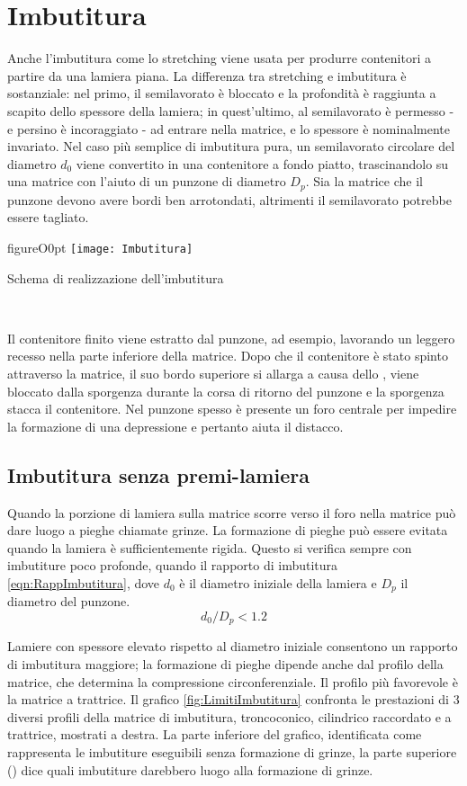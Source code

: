 \section{Imbutitura}
Anche l'imbutitura come lo stretching viene usata per produrre contenitori a partire da una lamiera piana. La differenza tra stretching e imbutitura è sostanziale: nel primo, il semilavorato è bloccato e la profondità è raggiunta a scapito dello spessore della lamiera; in quest'ultimo, al semilavorato è permesso - e persino è incoraggiato - ad entrare nella matrice, e lo spessore è nominalmente invariato.
Nel caso più semplice di imbutitura pura, un semilavorato circolare del diametro $d_0$ viene convertito in una contenitore a fondo piatto, trascinandolo su una matrice con l'aiuto di un punzone di diametro $D_p$.
Sia la matrice che il punzone devono avere bordi ben arrotondati, altrimenti il semilavorato potrebbe essere tagliato.

\begin{wrapfloat}{figure}{O}{0pt}
\texttt{[image: Imbutitura]}
\caption{Schema di realizzazione dell'imbutitura}
\label{fig:Imbutitura}
\end{wrapfloat}\

Il contenitore finito viene estratto dal punzone, ad esempio, lavorando un leggero recesso nella parte inferiore della matrice.
Dopo che il contenitore è stato spinto attraverso la matrice, il suo bordo superiore si allarga a causa dello , viene bloccato dalla sporgenza durante la corsa di ritorno del punzone e la sporgenza stacca il contenitore. Nel punzone spesso è presente un foro centrale per impedire la formazione di una depressione e pertanto aiuta il distacco.

\subsection{Imbutitura senza premi-lamiera}
Quando la porzione di lamiera sulla matrice scorre verso il foro nella matrice può dare luogo a pieghe chiamate grinze. La formazione di pieghe può essere evitata quando la lamiera è sufficientemente rigida. Questo si verifica sempre con imbutiture poco profonde, quando il rapporto di imbutitura \eqref{eqn:RappImbutitura}, dove $d_0$ è il diametro iniziale della lamiera e $D_p$ il diametro del punzone.
\begin{equation}
d_0/D_p <1.2 \label{eqn:RappImbutitura}
\end{equation}

Lamiere con spessore elevato rispetto al diametro iniziale consentono un rapporto di imbutitura maggiore; la formazione di pieghe dipende anche dal profilo della matrice, che determina la compressione circonferenziale. Il profilo più favorevole è la matrice a trattrice.
Il grafico \ref{fig:LimitiImbutitura} confronta le prestazioni di 3 diversi profili della matrice di imbutitura, troncoconico, cilindrico raccordato e a trattrice, mostrati a destra. La parte inferiore del grafico, identificata come  rappresenta le imbutiture eseguibili senza formazione di grinze, la parte superiore () dice quali imbutiture darebbero luogo alla formazione di grinze.

